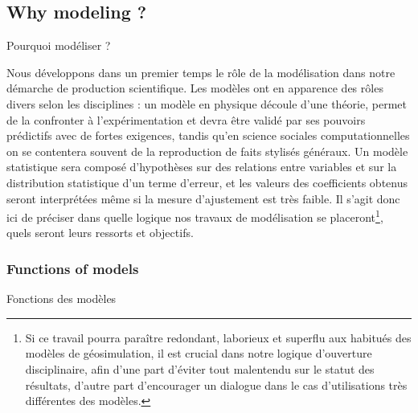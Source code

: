 \subsection{Why modeling ?}{Pourquoi modéliser ?}


Nous développons dans un premier temps le rôle de la modélisation dans notre démarche de production scientifique. Les modèles ont en apparence des rôles divers selon les disciplines : un modèle en physique découle d'une théorie, permet de la confronter à l'expérimentation et devra être validé par ses pouvoirs prédictifs avec de fortes exigences, tandis qu'en science sociales computationnelles on se contentera souvent de la reproduction de faits stylisés généraux. Un modèle statistique sera composé d'hypothèses sur des relations entre variables et sur la distribution statistique d'un terme d'erreur, et les valeurs des coefficients obtenus seront interprétées même si la mesure d'ajustement est très faible. Il s'agit donc ici de préciser dans quelle logique nos travaux de modélisation se placeront\footnote{Si ce travail pourra paraître redondant, laborieux et superflu aux habitués des modèles de géosimulation, il est crucial dans notre logique d'ouverture disciplinaire, afin d'une part d'éviter tout malentendu sur le statut des résultats, d'autre part d'encourager un dialogue dans le cas d'utilisations très différentes des modèles.}, quels seront leurs ressorts et objectifs.




\subsubsection{Functions of models}{Fonctions des modèles}


